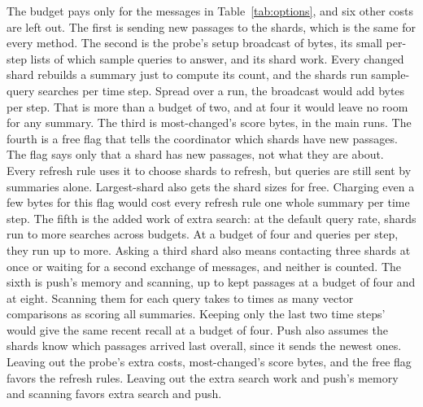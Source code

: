 The budget pays only for the messages in Table~\ref{tab:options}, and six other costs are left out.
The first is sending new passages to the shards, which is the same for every method.
The second is the probe's setup broadcast of \RNumRNSetupBroadcastBytes{} bytes, its small per-step lists of which sample queries to answer, and its shard work.
Every changed shard rebuilds a summary just to compute its count, and the shards run \RNumRNSampleSearchesPerEpoch{} sample-query searches per time step.
Spread over a run, the broadcast would add \RNumRNSetupAmortEpochBytes{} bytes per step.
That is more than a budget of two, and at four it would leave no room for any summary.
The third is most-changed's score bytes, in the main runs.
The fourth is a free flag that tells the coordinator which shards have new passages.
The flag says only that a shard has new passages, not what they are about.
Every refresh rule uses it to choose shards to refresh, but queries are still sent by summaries alone.
Largest-shard also gets the shard sizes for free.
Charging even a few bytes for this flag would cost every refresh rule one whole summary per time step.
The fifth is the added work of extra search: at the default query rate, shards run \RNumESLoadPctBTwo{} to \RNumESLoadPctBEight{} more searches across budgets.
At a budget of four and \RNumPlainQueriesLow{} queries per step, they run up to \RNumESLoadPctQFifty{} more.
Asking a third shard also means contacting three shards at once or waiting for a second exchange of messages, and neither is counted.
The sixth is push's memory and scanning, up to \RNumPVMaxVecsBFour{} kept passages at a budget of four and \RNumPVMaxVecsBEight{} at eight.
Scanning them for each query takes \RNumPlainPVScanRatioBFour{} to \RNumPlainPVScanRatioBEight{} times as many vector comparisons as scoring all summaries.
Keeping only the last two time steps' \RNumPVFifoVecsBFour{} would give the same recent recall at a budget of four.
Push also assumes the shards know which passages arrived last overall, since it sends the newest ones.
Leaving out the probe's extra costs, most-changed's score bytes, and the free flag favors the refresh rules.
Leaving out the extra search work and push's memory and scanning favors extra search and push.
